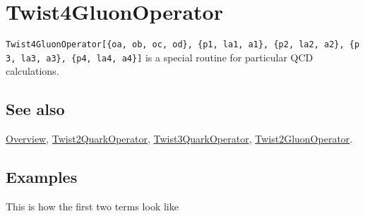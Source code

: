 \documentclass[../FeynCalcManual.tex]{subfiles}
\begin{document}
\hypertarget{twist4gluonoperator}{%
\section{Twist4GluonOperator}\label{twist4gluonoperator}}

\texttt{Twist4GluonOperator[\allowbreak{}\{\allowbreak{}oa,\ \allowbreak{}ob,\ \allowbreak{}oc,\ \allowbreak{}od\},\ \allowbreak{}\{\allowbreak{}p1,\ \allowbreak{}la1,\ \allowbreak{}a1\},\ \allowbreak{}\{\allowbreak{}p2,\ \allowbreak{}la2,\ \allowbreak{}a2\},\ \allowbreak{}\{\allowbreak{}p3,\ \allowbreak{}la3,\ \allowbreak{}a3\},\ \allowbreak{}\{\allowbreak{}p4,\ \allowbreak{}la4,\ \allowbreak{}a4\}]}
is a special routine for particular QCD calculations.

\subsection{See also}

\hyperlink{toc}{Overview},
\hyperlink{twist2quarkoperator}{Twist2QuarkOperator},
\hyperlink{twist3quarkoperator}{Twist3QuarkOperator},
\hyperlink{twist2gluonoperator}{Twist2GluonOperator}.

\subsection{Examples}

\begin{Shaded}
\begin{Highlighting}[]
\ExtensionTok{=}\OperatorTok{[\{}\OperatorTok{,}\OperatorTok{,}\OperatorTok{,}\OperatorTok{\},} \OperatorTok{\{}\OperatorTok{,}\OperatorTok{,}\OperatorTok{\},} \OperatorTok{\{}\OperatorTok{,}\OperatorTok{,}\OperatorTok{\},} 
    \OperatorTok{\{}\OperatorTok{,}\OperatorTok{,}\OperatorTok{\},} \OperatorTok{\{}\OperatorTok{,}\OperatorTok{,}\OperatorTok{\}]}\NormalTok{;}
\end{Highlighting}
\end{Shaded}

This is how the first two terms look like

\begin{Shaded}
\begin{Highlighting}[]
\OperatorTok{[[}\NormalTok{ ;; }\OperatorTok{]]}
\end{Highlighting}
\end{Shaded}
\end{document}
